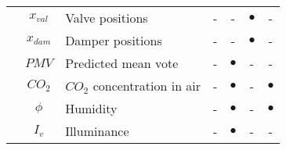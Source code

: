 \documentclass[10pt]{extarticle}
\begin{document}
\begin{table}[h]
\begin{tabular}{l|c|l|cccc}
		& $x_{val}$ & Valve positions & - & - & $\bullet$ & - \\
		& $x_{dam}$ & Damper positions & - & - & $\bullet$ & - \\
		\midrule
		 &
		$PMV$ & Predicted mean vote & - & $\bullet$ & - & - \\
		& $CO_2$ & $CO_2$ concentration in air & - & $\bullet$ & - & $\bullet$ \\
		& $\phi$ & Humidity & - & $\bullet$ & - & $\bullet$ \\
		& $I_v$ & Illuminance & - & $\bullet$ & - & - \\
		\bottomrule 
	\end{tabular}
\end{table} 
\end{document}
